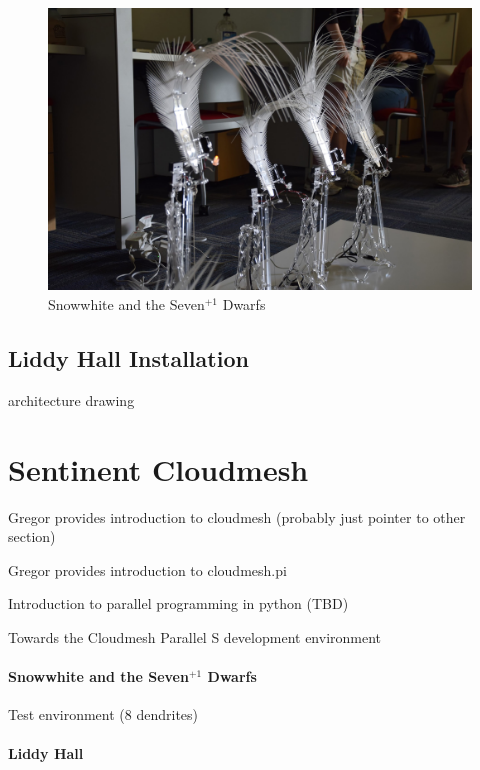 \begin{figure}
\centering
\includegraphics[width=\columnwidth]{images/snowwhite.jpg}
\caption{Snowwhite and the Seven$^{+1}$  Dwarfs}
\label{F:snowwhite}
\end{figure}


\subsection{Liddy Hall Installation}

architecture drawing


\section{Sentinent Cloudmesh}

	Gregor provides introduction to cloudmesh (probably just pointer to other section)

	Gregor provides introduction to cloudmesh.pi 

	Introduction to parallel programming in python (TBD)

	Towards the Cloudmesh Parallel S development environment


\paragraph{Snowwhite and the Seven$^{+1}$ Dwarfs}

Test environment (8 dendrites)

\paragraph{Liddy Hall}

